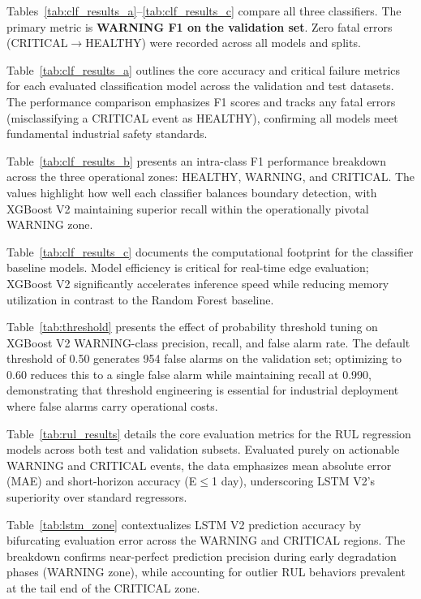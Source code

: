 \documentclass[conference]{IEEEtran}
\begin{document}
Tables~\ref{tab:clf_results_a}--\ref{tab:clf_results_c} compare all three
classifiers. The primary metric is \textbf{WARNING F1 on the validation set}.
Zero fatal errors (CRITICAL$\rightarrow$HEALTHY) were recorded across all
models and splits.

Table~\ref{tab:clf_results_a} outlines the core accuracy and critical failure metrics for each evaluated classification model across the validation and test datasets. The performance comparison emphasizes F1 scores and tracks any fatal errors (misclassifying a CRITICAL event as HEALTHY), confirming all models meet fundamental industrial safety standards.

Table~\ref{tab:clf_results_b} presents an intra-class F1 performance breakdown across the three operational zones: HEALTHY, WARNING, and CRITICAL. The values highlight how well each classifier balances boundary detection, with XGBoost V2 maintaining superior recall within the operationally pivotal WARNING zone.

Table~\ref{tab:clf_results_c} documents the computational footprint for the classifier baseline models. Model efficiency is critical for real-time edge evaluation; XGBoost V2 significantly accelerates inference speed while reducing memory utilization in contrast to the Random Forest baseline.

Table~\ref{tab:threshold} presents the effect of probability threshold tuning on XGBoost V2 WARNING-class precision, recall, and false alarm rate. The default threshold of 0.50 generates 954 false alarms on the validation set; optimizing to 0.60 reduces this to a single false alarm while maintaining recall at 0.990, demonstrating that threshold engineering is essential for industrial deployment where false alarms carry operational costs.

Table~\ref{tab:rul_results} details the core evaluation metrics for the RUL regression models across both test and validation subsets. Evaluated purely on actionable WARNING and CRITICAL events, the data emphasizes mean absolute error (MAE) and short-horizon accuracy (E$\leq$1 day), underscoring LSTM V2's superiority over standard regressors.

Table~\ref{tab:lstm_zone} contextualizes LSTM V2 prediction accuracy by bifurcating evaluation error across the WARNING and CRITICAL regions. The breakdown confirms near-perfect prediction precision during early degradation phases (WARNING zone), while accounting for outlier RUL behaviors prevalent at the tail end of the CRITICAL zone.
\end{document}
